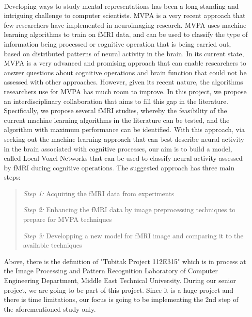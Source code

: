 \documentclass[paper=a4, fontsize=12pt]{scrartcl}	%
\numberwithin{equation}{section}		%
\numberwithin{figure}{section}			%
\numberwithin{table}{section}				%
\begin{document}
		\paragraph{}
        \normalsize
		Developing ways to study mental representations has been a long-standing and intriguing challenge to computer scientists. MVPA is a very
		recent approach that few researchers have implemented in neuroimaging research. MVPA uses machine learning algorithms to train on fMRI
		data, and can be used to classify the type of information being processed or cognitive operation that is being carried out, based on
		distributed patterns of neural activity in the brain. In its current state, MVPA is a very advanced and promising approach that can
		enable researchers to answer questions about cognitive operations and brain function that could not be assessed with other approaches.
		However, given its recent nature, the algorithms researchers use for MVPA has much room to improve. In this project, we propose an
		interdisciplinary collaboration that aims to fill this gap in the literature. Specifically, we propose several fMRI studies, whereby
		the feasibility of the current machine learning algorithms in the literature can be tested, and the algorithm with maximum
		performance can be identified. With this approach, via seeking out the machine learning approach that can best describe neural
		activity in the brain associated with cognitive processes, our aim is to build a model, called Local Voxel Networks that can be
		used to classify neural activity assessed by fMRI during cognitive operations. The suggested approach has three main steps:\\
		\begin{quote}
		\textit{Step 1:} Acquiring the fMRI data from experiments

		\textit{Step 2:} Enhancing the fMRI data by image preprocessing techniques to prepare for MVPA techniques

		\textit{Step 3:} Developping a new model for fMRI image and comparing it to the available techniques\\
        \end{quote}
        
        Above, there is the definition of "Tubitak Project 112E315" which is in process at the Image Processing and Pattern Recognition Laboratory of Computer Engineering Department, Middle East Technical University. During our senior project, we are going to be part of this project. Since it is a huge project and there is time limitations, our focus is going to be implementing the 2nd step of the aforementioned study only.\\
        
\end{document}
